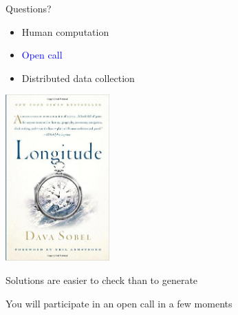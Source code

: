 \documentclass[aspectratio=169]{beamer}
\begin{document}
\begin{frame}

{\Large
\begin{center}
Questions?
\end{center}
}

\end{frame}
\begin{frame}

\begin{itemize}
\item Human computation
\item \textcolor{blue}{Open call}
\item Distributed data collection
\end{itemize}

\end{frame}
\begin{frame}

\begin{center}
\includegraphics[width=0.3\textwidth]{figures/sobel_longitude_2007_cover}
\end{center}

\end{frame}
\begin{frame}

{\Large
\begin{center}
Solutions are easier to check than to generate
\end{center}
}

\end{frame}
\begin{frame}

{\Large
\begin{center}
You will participate in an open call in a few moments
\end{center}
}

\end{frame}
\end{document}
